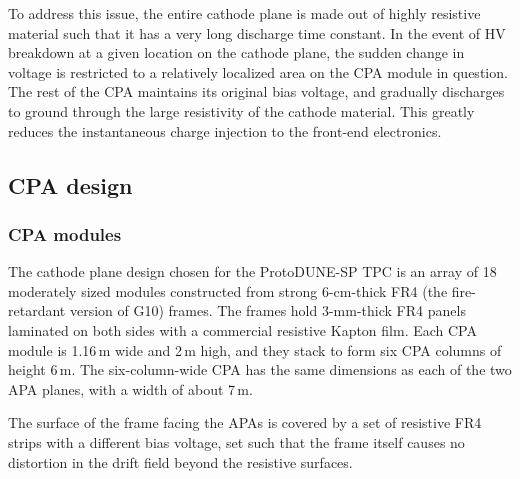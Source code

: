 To address this issue, the entire cathode plane is made out of highly resistive material such that it has a very long discharge time constant.  In the event of HV breakdown at a given location on the cathode plane, the sudden change in voltage is restricted to  a relatively localized area on the CPA module in question.  The rest of the CPA maintains its original bias voltage, and gradually discharges to ground through the large resistivity of the cathode material.  This greatly reduces the instantaneous charge injection to the front-end electronics.


\subsection{CPA design}

\subsubsection{CPA modules}


The cathode plane design chosen for the ProtoDUNE-SP TPC is an array of 18 moderately sized modules constructed from strong 6-cm-thick FR4 (the fire-retardant version of G10) frames. The frames hold 3-mm-thick FR4 panels laminated on both sides with a commercial resistive Kapton film.   Each CPA module is 1.16\,m wide and 2\,m high, and they stack to form six CPA columns of height 6\,m.  The six-column-wide CPA has the same dimensions as each of the two APA planes, with a width of about 7\,m.

 The surface of the frame facing the APAs is covered by a set of resistive FR4 strips with a different bias voltage, set such that 
 the frame itself causes no distortion in the drift field beyond the resistive surfaces.

